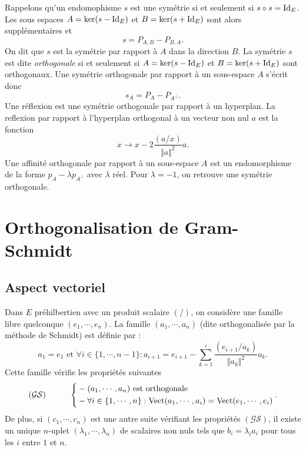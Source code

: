 \newpage
Rappelons qu'un endomophisme $s$ est une symétrie si et seulement si $s\circ s = \mathop{\mathrm{Id}}_E$. Les sous espaces $A = \ker(s-\mathop{\mathrm{Id}}_E)$ et $B = \ker(s + \mathop{\mathrm{Id}}_E)$ sont alors supplémentaires et 
\[
 s = P_{A,B} - P_{B,A}.
\]
On dit que $s$ est la symétrie par  rapport à $A$ dans la direction $B$. La symétrie $s$ est dite \emph{orthogonale} si et seulement si $A = \ker(s-\mathop{\mathrm{Id}}_E)$ et $B = \ker(s + \mathop{\mathrm{Id}}_E)$ sont orthogonaux. Une symétrie orthogonale par rapport à un sous-espace $A$ s'écrit donc
\[
 s_A = P_{A} - P_{A^\bot}.
\]
Une réflexion est une symétrie orthogonale par rapport à un hyperplan.\newline
La reflexion par rapport à l'hyperplan orthogonal à un vecteur non nul $a$ est la fonction
\begin{displaymath}
 x\rightarrow x - 2\frac{(a/x)}{\Vert a\Vert^2}a.
\end{displaymath}
Une affinité orthogonale par rapport à un sous-espace $A$ est un endomorphisme de la forme $p_A - \lambda p_{A^\bot}$ avec $\lambda$ réel. Pour $\lambda = -1$, on retrouve une symétrie orthogonale. 
\clearpage
\section{Orthogonalisation de Gram-Schmidt}
\subsection{Aspect vectoriel}
Dans $E$ préhilbertien avec un produit scalaire $(/)$, on considère une famille libre quelconque $(e_1,\cdots,e_n)$. La famille $(a_1,\cdots,a_n)$ (dite orthogonalisée par la méthode de Schmidt) est définie par :
\begin{displaymath}
 a_1 = e_1 \text{ et }
\forall i \in\{1,\cdots, n-1\} : a_{i+1} = e_{i+1}-\sum_{k=1}^i\frac{(e_{i+1}/a_k)}{\Vert a_k\Vert^2}a_k.
\end{displaymath}
Cette famille vérifie les propriétés suivantes
\begin{displaymath}
 (\mathcal {GS})\hspace{1cm}
\left\lbrace
\begin{aligned}
 &- (a_1,\cdots,a_n) \text{ est orthogonale} \\
 &- \forall i\in\{1,\cdots,n\} : \mathop{\mathrm{Vect}}(a_1,\cdots,a_i)=\mathop{\mathrm{Vect}}(e_1,\cdots,e_i)
\end{aligned}
 \right. .
\end{displaymath}
De plus, si $(c_1,\cdots,c_n)$ est une autre suite vérifiant les propriétés $(\mathcal{GS})$, il existe un unique $n$-uplet $(\lambda_1,\cdots,\lambda_n)$ de scalaires non nuls tels que $b_i=\lambda_i a_i$ pour tous les $i$ entre $1$ et $n$.

